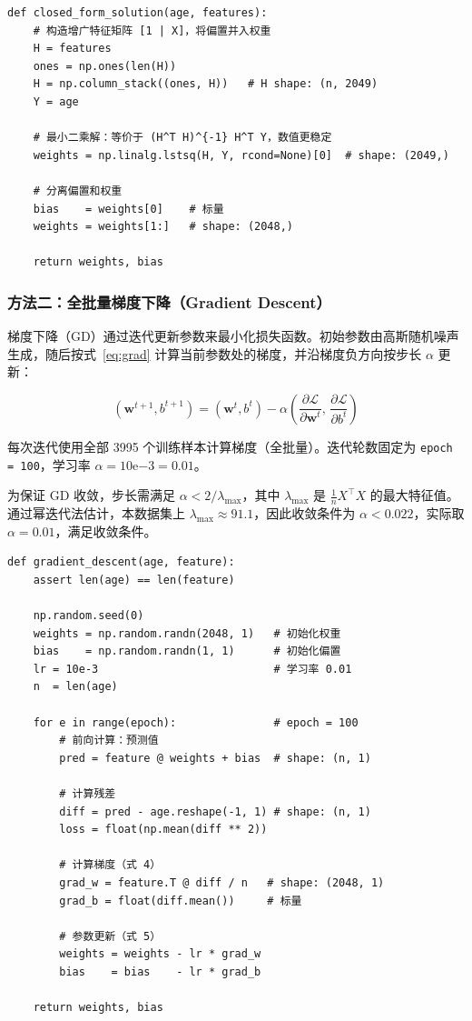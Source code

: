 \documentclass[12pt,a4paper]{ctexart}
\begin{document}
\begin{lstlisting}
def closed_form_solution(age, features):
    # 构造增广特征矩阵 [1 | X]，将偏置并入权重
    H = features
    ones = np.ones(len(H))
    H = np.column_stack((ones, H))   # H shape: (n, 2049)
    Y = age

    # 最小二乘解：等价于 (H^T H)^{-1} H^T Y，数值更稳定
    weights = np.linalg.lstsq(H, Y, rcond=None)[0]  # shape: (2049,)

    # 分离偏置和权重
    bias    = weights[0]    # 标量
    weights = weights[1:]   # shape: (2048,)

    return weights, bias
\end{lstlisting}

\subsubsection{方法二：全批量梯度下降（Gradient Descent）}

梯度下降（GD）通过迭代更新参数来最小化损失函数。初始参数由高斯随机噪声生成，随后按式~\eqref{eq:grad} 计算当前参数处的梯度，并沿梯度负方向按步长 $\alpha$ 更新：

\begin{equation}
  (\mathbf{w}^{t+1}, b^{t+1}) = (\mathbf{w}^t, b^t) - \alpha \left(\frac{\partial \mathcal{L}}{\partial \mathbf{w}^t},\, \frac{\partial \mathcal{L}}{\partial b^t}\right)
  \label{eq:gd}
\end{equation}

每次迭代使用全部 3995 个训练样本计算梯度（全批量）。迭代轮数固定为 \texttt{epoch = 100}，学习率 $\alpha = 10\mathrm{e}{-3} = 0.01$。

为保证 GD 收敛，步长需满足 $\alpha < 2 / \lambda_\text{max}$，其中 $\lambda_\text{max}$ 是 $\frac{1}{n}X^\top X$ 的最大特征值。通过幂迭代法估计，本数据集上 $\lambda_\text{max} \approx 91.1$，因此收敛条件为 $\alpha < 0.022$，实际取 $\alpha = 0.01$，满足收敛条件。

\begin{lstlisting}
def gradient_descent(age, feature):
    assert len(age) == len(feature)

    np.random.seed(0)
    weights = np.random.randn(2048, 1)   # 初始化权重
    bias    = np.random.randn(1, 1)      # 初始化偏置
    lr = 10e-3                           # 学习率 0.01
    n  = len(age)

    for e in range(epoch):               # epoch = 100
        # 前向计算：预测值
        pred = feature @ weights + bias  # shape: (n, 1)

        # 计算残差
        diff = pred - age.reshape(-1, 1) # shape: (n, 1)
        loss = float(np.mean(diff ** 2))

        # 计算梯度（式 4）
        grad_w = feature.T @ diff / n   # shape: (2048, 1)
        grad_b = float(diff.mean())     # 标量

        # 参数更新（式 5）
        weights = weights - lr * grad_w
        bias    = bias    - lr * grad_b

    return weights, bias
\end{lstlisting}
\end{document}
